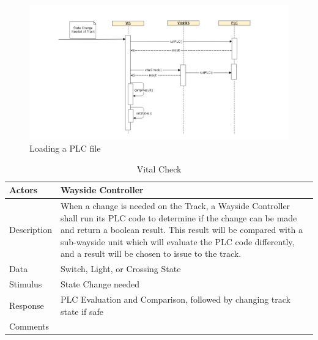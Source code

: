 \documentclass[]{article}
\begin{document}
	\begin{figure}[H]
		\centering
		\includegraphics[scale=.5]{seq_wayside_setvital.png}
		\caption{Loading a PLC file}
	\end{figure}
	\begin{table}[H]
		\centering
		\caption{Vital Check}
		\begin{tabular}{|l|l|}
			\hline
			Actors & \parbox[t]{10cm}{Wayside Controller} \\ \hline
			Description & \parbox[t]{10cm}{When a change is needed on the Track, a Wayside Controller shall run its PLC code to determine if the change can be made and return a boolean result. This result will be compared with a sub-wayside unit which will evaluate the PLC code differently, and a result will be chosen to issue to the track. } \\ \hline
			Data &  \parbox[t]{10cm}{Switch, Light, or Crossing State} \\ \hline
			Stimulus &  \parbox[t]{10cm}{State Change needed} \\ \hline
			Response & \parbox[t]{10cm}{PLC Evaluation and Comparison, followed by changing track state if safe}\\ \hline
			Comments & \parbox[t]{10cm}{}  \\ \hline
		\end{tabular}
	\end{table}
	
\end{document}
